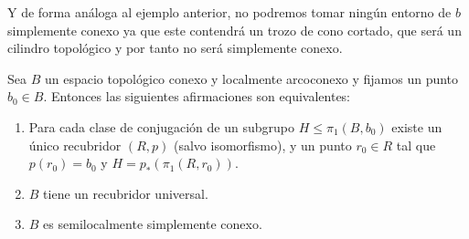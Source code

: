 \begin{ejemplo}
\begin{enumerate}
\begin{figure}[H]
        \end{figure}

        Y de forma análoga al ejemplo anterior, no podremos tomar ningún entorno de $b$ simplemente conexo ya que este contendrá un trozo de cono cortado, que será un cilindro topológico y por tanto no será simplemente conexo.
    \end{enumerate}
\end{ejemplo}

\begin{teo}
    Sea $B$ un espacio topológico conexo y localmente arcoconexo y fijamos un punto $b_0\in B$. Entonces las siguientes afirmaciones son equivalentes:
    \begin{enumerate}
        \item Para cada clase de conjugación de un subgrupo $H\leq \pi_1(B,b_0)$ existe un único recubridor $(R,p)$ (salvo isomorfismo), y un punto $r_0\in R$ tal que $p(r_0)=b_0$ y $H=p_*(\pi_1(R,r_0))$.
        \item $B$ tiene un recubridor universal.
        \item $B$ es semilocalmente simplemente conexo.
    \end{enumerate} 
\end{teo}